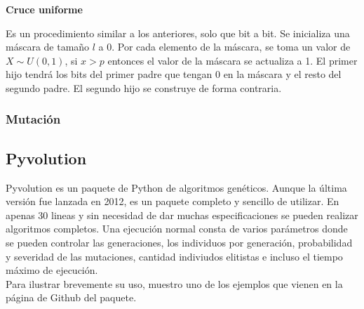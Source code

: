 \documentclass[12pt,a4paper]{article}
\begin{document}
			\textbf{Cruce uniforme}
			
			Es un procedimiento similar a los anteriores, solo que bit a bit. Se inicializa una m\'ascara de tama\~no $l$ a 0. Por cada elemento de la m\'ascara, se toma un valor de $X \sim U(0,1)$, si $x > p$ entonces el valor de la m\'ascara se actualiza a 1. El primer hijo tendr\'a los bits del primer padre que tengan 0 en la m\'ascara y el resto del segundo padre. El segundo hijo se construye de forma contraria. 
			
			
			\subsubsection{Mutaci\'on}

		\subsection{Pyvolution}
		
		Pyvolution es un paquete de Python de algoritmos gen\'eticos. Aunque la \'ultima versi\'on fue lanzada en 2012, es un paquete completo y sencillo de utilizar. En apenas 30 lineas y sin necesidad de dar muchas especificaciones se pueden realizar algoritmos completos. Una ejecuci\'on normal consta de varios par\'ametros donde se pueden controlar las generaciones, los individuos por generaci\'on, probabilidad y severidad de las mutaciones, cantidad indiviudos elitistas e incluso el tiempo m\'aximo de ejecuci\'on.\\
		
		Para ilustrar brevemente su uso, muestro uno de los ejemplos que vienen en la p\'agina de Github del paquete.
		
\end{document}
